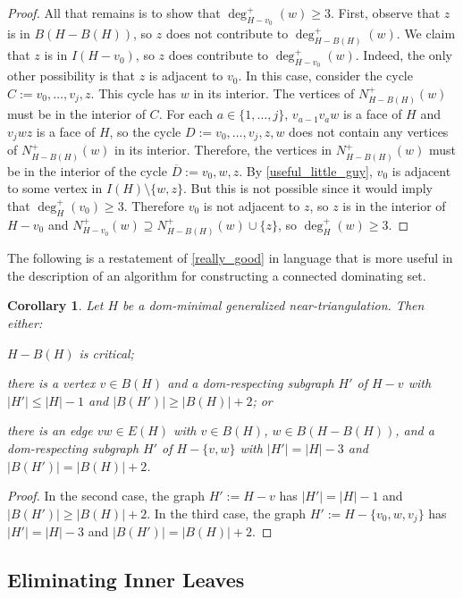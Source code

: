 \documentclass[11pt]{article}
\newtheorem{cor}{Corollary}
\theoremstyle{definition}
\begin{document}
\begin{proof}
  All that remains is to show that $\deg^+_{H-v_0}(w)\ge 3$.  First, observe that $z$ is in $B(H-B(H))$, so $z$ does not contribute to $\deg^+_{H-B(H)}(w)$. We claim that $z$ is in $I(H-v_0)$, so $z$ does contribute to $\deg^+_{H-v_0}(w)$.   Indeed, the only other possibility is that $z$ is adjacent to $v_0$.  In this case, consider the cycle $C:=v_0,\ldots,v_j,z$.  This cycle has $w$ in its interior. The vertices of $N^+_{H-B(H)}(w)$ must be in the interior of $C$. For each $a\in\{1,\ldots,j\}$, $v_{a-1}v_a w$ is a face of $H$ and $v_jwz$ is a face of $H$, so the cycle $D:=v_0,\ldots,v_j,z,w$ does not contain any vertices of $N^+_{H-B(H)}(w)$ in its interior.  Therefore, the vertices in $N^+_{H-B(H)}(w)$ must be in the interior of the cycle $\overline{D}:=v_0,w,z$.  By \cref{useful_little_guy}, $v_0$ is adjacent to some vertex in $I(H)\setminus\{w,z\}$. But this is not possible since it would imply that $\deg^+_H(v_0)\ge 3$.  Therefore $v_0$ is not adjacent to $z$, so $z$ is in the interior of $H-v_0$ and $N^+_{H-v_0}(w)\supseteq N^+_{H-B(H)}(w)\cup\{z\}$, so $\deg^+_H(w)\ge 3$.
\end{proof}


The following is a restatement of \cref{really_good} in language that is more useful in the description of an algorithm for constructing a connected dominating set.

\begin{cor}\label{really_good_cor}
  Let $H$ be a dom-minimal generalized near-triangulation.  Then either:
  \begin{compactenum}[(1)]
    \item $H-B(H)$ is critical;
    \item there is a vertex $v\in B(H)$ and a dom-respecting subgraph $H'$ of  $H-v$ with $|H'|\le |H|-1$ and $|B(H')|\ge |B(H)|+2$; or
    \item there is an edge $vw\in E(H)$ with $v\in B(H)$, $w\in B(H-B(H))$, and a dom-respecting subgraph $H'$ of $H-\{v,w\}$ with $|H'|= |H|-3$ and $|B(H')|=|B(H)|+2$.
  \end{compactenum}
\end{cor}

\begin{proof}
  In the second case, the graph $H':=H-v$ has $|H'|=|H|-1$ and $|B(H')|\ge |B(H)|+2$. In the third case, the graph $H':=H-\{v_0,w,v_j\}$ has $|H'|=|H|-3$ and $|B(H')|=|B(H)|+2$.
\end{proof}


\subsection{Eliminating Inner Leaves}
\label{one_kill_sec}
\end{document}
